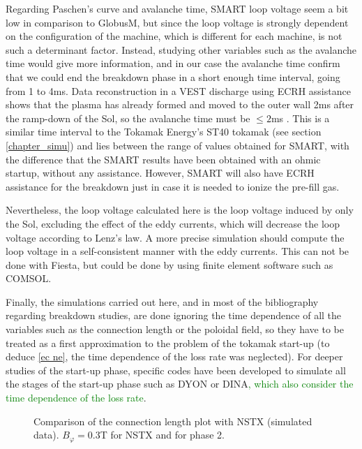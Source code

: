 \documentclass[a4paper,12pt,oneside]{book}
\begin{document}
Regarding Paschen's curve and avalanche time, SMART loop voltage seem a bit low in comparison to GlobusM, but since the loop voltage is strongly dependent on the configuration of the machine, which is different for each machine, is not such a determinant factor. Instead, studying other variables such as the avalanche time would give more information, and in our case the avalanche time confirm that we could end the breakdown phase in a short enough time interval, going from 1 to 4ms. Data reconstruction in a VEST discharge using ECRH assistance shows that the plasma has already formed and moved to the outer wall 2ms after the ramp-down of the Sol, so the avalanche time must be $\leq 2$ms \cite{VEST_2015}. This is a similar time interval to the Tokamak Energy's ST40 tokamak (see section \ref{chapter_simu}) and lies between the range of values obtained for SMART, with the difference that the SMART results have been obtained with an ohmic startup, without any assistance. However, SMART will also have ECRH assistance for the breakdown just in case it is needed to ionize the pre-fill gas.

Nevertheless, the loop voltage calculated here is the loop voltage induced by only the Sol, excluding the effect of the eddy currents, which will decrease the loop voltage according to Lenz's law. A more precise simulation should compute the loop voltage in a self-consistent manner with the eddy currents. This can not be done with Fiesta, but could be done by using finite element software such as COMSOL.

Finally, the simulations carried out here, and in most of the bibliography regarding breakdown studies, are done ignoring the time dependence of all the variables such as the connection length or the poloidal field, so they have to be treated as a first approximation to the problem of the tokamak start-up (to deduce \eqref{ec ne}, the time dependence of the loss rate was neglected). For deeper studies of the start-up phase, specific codes have been developed to simulate all the stages of the start-up phase such as DYON \cite{KimThesis} or DINA\textcolor{green}{, which also consider the time dependence of the loss rate}.

\begin{figure}[htbp]
\centering
{}
\hfill

\hfill
{}



\caption{Comparison of the connection length plot with NSTX \cite{NSTX_2017, NSTX_cross} (simulated data). $B_\varphi=0.3$T for NSTX and for phase 2.}
\label{fig_L_NSTX}
\end{figure}
\end{document}
